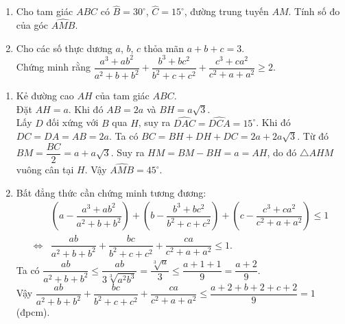 \begin{ex}%
    \hfill
    \begin{enumerate}
    	\item Cho tam giác $ABC$ có $\widehat{B}=30^\circ$, $\widehat{C}=15^\circ$, đường trung tuyến $AM$. Tính số đo của góc $\widehat{AMB}$.
    	\item Cho các số thực dương $a$, $b$, $c$ thỏa mãn $a+b+c=3$.\\ Chứng minh rằng $\dfrac{a^3+ab^2}{a^2+b+b^2}+\dfrac{b^3+bc^2}{b^2+c+c^2}+\dfrac{c^3+ca^2}{c^2+a+a^2}\ge2$.
    \end{enumerate}
\loigiai
    {\begin{center}
    	\end{center}
    	\begin{enumerate}
    		\item Kẻ đường cao $AH$ của tam giác $ABC$.\\
    		Đặt $AH=a$. Khi đó $AB=2a$ và $BH=a\sqrt{3}$.\\
    		Lấy $D$ đối xứng với $B$ qua $H$, suy ra $\widehat{DAC}=\widehat{DCA}=15^\circ$. Khi đó
    		$DC=DA=AB=2a$. Ta có 
    		$BC=BH+DH+DC=2a+2a\sqrt{3}$. Từ đó $BM=\dfrac{BC}{2}=a+a\sqrt{3}$. 
    		Suy ra $ HM=BM-BH=a=AH$, do đó $\triangle AHM$ vuông cân tại $H$. Vậy $\widehat{AMB}=45^\circ$.
    		\item Bất đẳng thức cần chứng minh tương đương:
    		{\allowdisplaybreaks
    		\begin{align*}
    		&\left(a-\dfrac{a^3+ab^2}{a^2+b+b^2}\right)+\left(b-\dfrac{b^3+bc^2}{b^2+c+c^2}\right)+\left(c-\dfrac{c^3+ca^2}{c^2+a+a^2}\right)\le1\\
    		\Leftrightarrow&\dfrac{ab}{a^2+b+b^2}+\dfrac{bc}{b^2+c+c^2}+\dfrac{ca}{c^2+a+a^2}\le 1.
    		\end{align*}}
    		Ta có  $\dfrac{ab}{a^2+b+b^2}\le\dfrac{ab}{3\sqrt[3]{a^2b^3}}=\dfrac{\sqrt[3]{a}}{3}\le\dfrac{a+1+1}{9}=\dfrac{a+2}{9}$.\\
    		Vậy $\dfrac{ab}{a^2+b+b^2}+\dfrac{bc}{b^2+c+c^2}+\dfrac{ca}{c^2+a+a^2}\le\dfrac{a+2+b+2+c+2}{9}=1$ (đpcm).
    	\end{enumerate}}
\end{ex}
